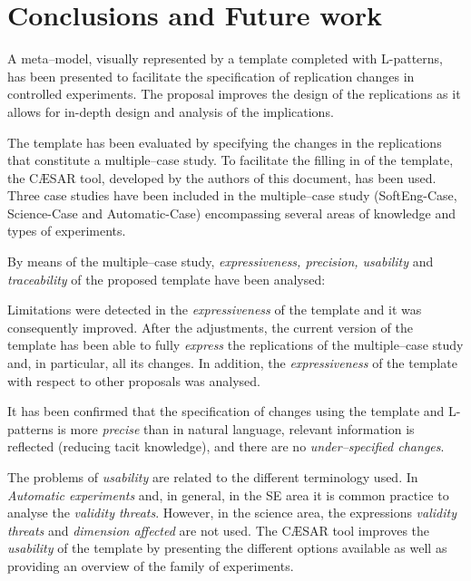 
\section{Conclusions and Future work}
\label{sec:conclusions}

A meta--model, visually represented by a template completed with L-patterns, has been presented to facilitate the specification of replication changes in controlled experiments. 
The proposal improves the design of the replications as it allows for in-depth design and analysis of the implications.

The template has been evaluated by specifying the changes in the replications that constitute a multiple--case study. To facilitate the filling in of the template, the CÆSAR tool, developed by the authors of this document, has been used. Three case studies have been included in the multiple--case study (SoftEng-Case, Science-Case and Automatic-Case) encompassing several areas of knowledge and types of experiments.

By means of the multiple--case study, \emph{expressiveness, precision, usability} and \emph{traceability} of the proposed template have been analysed:

Limitations were detected in the \emph{expressiveness} of the template and it was consequently improved. %
After the adjustments, the current version of the template has been able to fully \emph{express} the replications of the multiple--case study and, in particular, all its changes. %
In addition, the \emph{expressiveness} of the template  with respect to other proposals was analysed.

It has been confirmed that the specification of changes using the template and L-patterns is more \emph{precise} than in natural language, relevant information is reflected (reducing tacit knowledge), and there are no \emph{under--specified changes}.

The problems of \emph{usability} are related to the different terminology used. In \emph{Automatic experiments} and, in general, in the \gls{SE} area it is common practice to analyse the \emph{validity threats}. However, in the science area, the expressions \emph{validity threats} and \emph{dimension affected} are not used. 
The CÆSAR tool improves the \emph{usability} of the template by presenting the different options available as well as providing an overview of the family of experiments.


